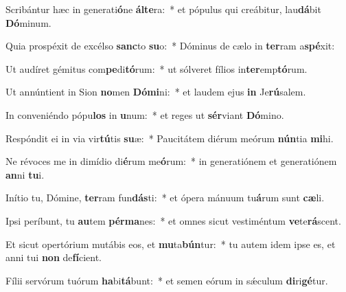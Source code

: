 \item Scribántur hæc in generati\textbf{ó}ne \textbf{ál}\textbf{te}ra:~* et pópulus qui creábitur, lau\textbf{dá}bit \textbf{Dó}minum.
\item Quia prospéxit de excélso \textbf{sanc}to \textbf{su}o:~* Dóminus de cælo in \textbf{ter}ram a\textbf{spé}xit:
\item Ut audíret gémitus com\textbf{pe}di\textbf{tó}rum:~* ut sólveret fílios in\textbf{ter}emp\textbf{tó}rum.
\item Ut annúntient in Sion \textbf{no}men \textbf{Dó}\textbf{mi}ni:~* et laudem ejus \textbf{in} Je\textbf{rú}salem.
\item In conveniéndo pópu\textbf{los} in \textbf{u}num:~* et reges ut \textbf{sér}viant \textbf{Dó}mino.
\item Respóndit ei in via vir\textbf{tú}tis \textbf{su}æ:~* Paucitátem diérum meórum \textbf{nún}tia \textbf{mi}hi.
\item Ne révoces me in dimídio di\textbf{é}rum me\textbf{ó}rum:~* in generatiónem et generatiónem \textbf{an}ni \textbf{tu}i.
\item Inítio tu, Dómine, \textbf{ter}ram fun\textbf{dás}ti:~* et ópera mánuum tu\textbf{á}rum sunt \textbf{cæ}li.
\item Ipsi períbunt, tu \textbf{au}tem \textbf{pér}\textbf{ma}nes:~* et omnes sicut vestiméntum \textbf{ve}te\textbf{rá}scent.
\item Et sicut opertórium mutábis eos, et \textbf{mu}ta\textbf{bún}tur:~* tu autem idem ipse es, et anni tui \textbf{non} de\textbf{fí}cient.
\item Fílii servórum tuórum \textbf{ha}bi\textbf{tá}bunt:~* et semen eórum in sǽculum \textbf{di}ri\textbf{gé}tur.
